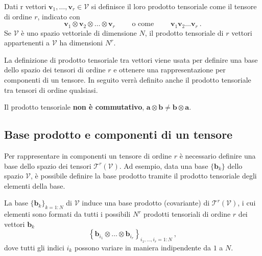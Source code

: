 \begin{definition} Dati r vettori $\bm{v}_1,\dots,\bm{v}_r \in \mathcal{V}$ si definisce il loro prodotto tensoriale come il tensore di ordine $r$, indicato con
\begin{equation}
    \bm{v}_1 \otimes \bm{v}_2 \otimes \dots \otimes \bm{v}_r \qquad \text{ o come } \qquad  \bm{v}_1 \bm{v}_2 \dots \bm{v}_r  \ .
\end{equation}
 Se $\mathcal{V}$ è uno spazio vettoriale di dimensione $N$, il prodotto tensoriale di $r$ vettori appartenenti a $\mathcal{V}$ ha dimensioni $N^r$.
\end{definition}
La definizione di prodotto tensoriale tra vettori viene usata per definire una base dello spazio dei tensori di ordine $r$ e ottenere una rappresentazione per componenti di un tensore. In seguito verrà definito anche il prodotto tensoriale tra tensori di ordine qualsiasi. 
\begin{remark}
 Il prodotto tensoriale \textbf{non è commutativo}, $\bm{a} \otimes \bm{b} \neq \bm{b} \otimes \bm{a}$.
\end{remark}

\subsection{Base prodotto e componenti di un tensore}
Per rappresentare in componenti un tensore di ordine $r$ è necessario definire una base dello spazio dei tensori $\mathcal{T}^r(\mathcal{V})$. Ad esempio, data una base $\{ \bm{b}_k \}$ dello spazio $\mathcal{V}$, è possibile definire la base prodotto tramite il prodotto tensoriale degli elementi della base.
\begin{definition}[Base prodotto di $\mathcal{T}^r(\mathcal{V})$] %
 La base $\{ \bm{b}_k \}_{k=1:N}$ di $\mathcal{V}$
    induce una base prodotto (covariante) di $\mathcal{T}^r(\mathcal{V})$, i cui elementi sono formati da tutti i possibili $N^r$ prodotti tensoriali di ordine $r$ dei vettori $\bm{b}_k$
\begin{equation}
  \left\{ \bm{b}_{i_1} \otimes \dots \otimes \bm{b}_{i_r} \right\}_{
  i_1,\dots,i_r = 1 : N} \ ,
\end{equation}
dove tutti gli indici $i_k$ possono variare in maniera indipendente da $1$ a $N$.
\end{definition}

